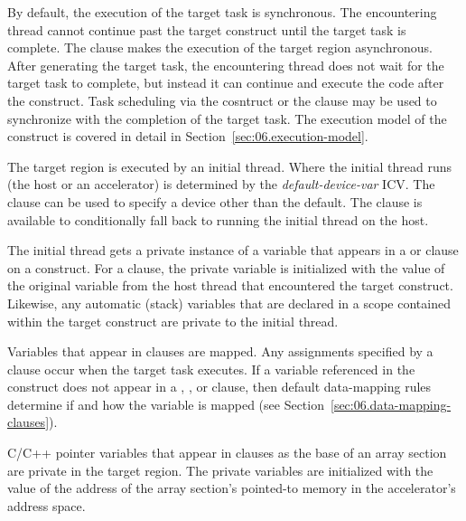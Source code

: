 By default, the execution of the target task is synchronous.  The encountering
thread cannot continue past the target construct until the target task is
complete.  The  clause makes the execution of the target region
asynchronous.  After generating the target task, the encountering thread does
not wait for the target task to complete, but instead it can continue and
execute the code after the  construct.  Task scheduling via
the  cosntruct or the  clause may be used to
synchronize with the completion of the target task.  The execution model of the
 construct is covered in detail in
Section~\ref{sec:06.execution-model}.

The target region is executed by an initial thread.  Where the initial thread
runs (the host or an accelerator) is determined by the \emph{default-device-var}
ICV. The  clause can be used to specify a device other than the
default.  The  clause is available to conditionally fall back to
running the initial thread on the host.

The initial thread gets a private instance of a variable that appears in a
 or  clause on a  construct.  For
a  clause, the private variable is initialized with the value
of the original variable from the host thread that encountered the target
construct.  Likewise, any automatic (stack) variables that are declared in a
scope contained within the target construct are private to the initial thread.

Variables that appear in  clauses are mapped.  Any assignments 
specified by a  clause occur when the target task executes. 
If a variable referenced in the  construct does not appear in a
, ,  or  clause,
then default data-mapping rules determine if and how the variable is mapped
(see Section~\ref{sec:06.data-mapping-clauses}).

C/C++ pointer variables that appear in  clauses as the base of an
array section are private in the target region. The private variables are 
initialized with the value
of the address of the array section's pointed-to memory in the accelerator's
address space.

